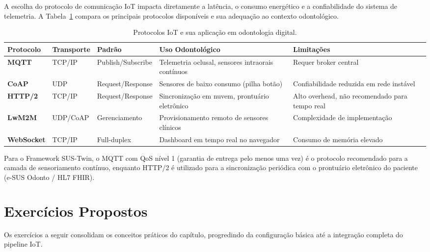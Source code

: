 A escolha do protocolo de comunicação IoT impacta diretamente a latência, o consumo energético e a confiabilidade do sistema de telemetria. A Tabela~\ref{tab:protocolos-iot} compara os principais protocolos disponíveis e sua adequação ao contexto odontológico.

\begin{table}[hbt!]
\centering
\caption{Protocolos IoT e sua aplicação em odontologia digital.}
\label{tab:protocolos-iot}
\small
\begin{tabular}{lp{2.8cm}p{1.8cm}p{4cm}p{2.5cm}}
\toprule
\textbf{Protocolo} & \textbf{Transporte} & \textbf{Padrão} & \textbf{Uso Odontológico} & \textbf{Limitações} \\
\midrule
\textbf{MQTT} & TCP/IP & Publish/Subscribe & Telemetria oclusal, sensores intraorais contínuos & Requer broker central \\
\addlinespace
\textbf{CoAP} & UDP & Request/Response & Sensores de baixo consumo (pilha botão) & Confiabilidade reduzida em rede instável \\
\addlinespace
\textbf{HTTP/2} & TCP/IP & Request/Response & Sincronização em nuvem, prontuário eletrônico & Alto overhead, não recomendado para tempo real \\
\addlinespace
\textbf{LwM2M} & UDP/CoAP & Gerenciamento & Provisionamento remoto de sensores clínicos & Complexidade de implementação \\
\addlinespace
\textbf{WebSocket} & TCP/IP & Full-duplex & Dashboard em tempo real no navegador & Consumo de memória elevado \\
\bottomrule
\end{tabular}
\end{table}

Para o Framework SUS-Twin, o MQTT com QoS nível 1 (garantia de entrega pelo menos uma vez) é o protocolo recomendado para a camada de sensoriamento contínuo, enquanto HTTP/2 é utilizado para a sincronização periódica com o prontuário eletrônico do paciente (e-SUS Odonto / HL7 FHIR).

\section{Exercícios Propostos}

Os exercícios a seguir consolidam os conceitos práticos do capítulo, progredindo da configuração básica até a integração completa do pipeline IoT.

